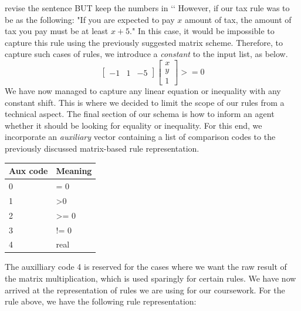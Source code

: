 revise the sentence BUT keep the numbers in `$ $`
However, if our tax rule was to be as the following:
\linebreak
\linebreak
"If you are expected to pay $x$ amount of tax, the amount of tax you pay must be at least $x + 5$."
\linebreak
\linebreak
In this case, it would be impossible to capture this rule using the previously suggested matrix scheme. Therefore, to capture such cases of rules, we introduce a \emph{constant} to the input list, as below.
\[
    \begin{bmatrix}
        -1 & 1 & -5
    \end{bmatrix}
    \begin{bmatrix}
        x \\
        y \\
        1
    \end{bmatrix}   
    >= 0  
\]
We have now managed to capture any linear equation or inequality with any constant shift. This is where we decided to limit the scope of our rules from a technical aspect.
The final section of our schema is how to inform an agent whether it should be looking for equality or inequality.
For this end, we incorporate an \emph{auxiliary} vector containing a list of comparison codes to the previously discussed matrix-based rule representation.
\begin{table}[h]
    \centering
    \begin{tabular}{ll}
    \hline
    \multicolumn{1}{|l}{Aux code} & \multicolumn{1}{l|}{Meaning} \\ \hline
    0                             & = 0                          \\
    1                             & \textgreater 0               \\
    2                             & \textgreater{}= 0            \\
    3                             & != 0                         \\
    4                             & real                        
    \end{tabular}
\end{table}
\linebreak
The auxilliary code 4 is reserved for the cases where we want the raw result of the matrix multiplication, which is used sparingly for certain rules.
We have now arrived at the representation of rules we are using for our coursework. For the rule above, we have the following rule representation:
